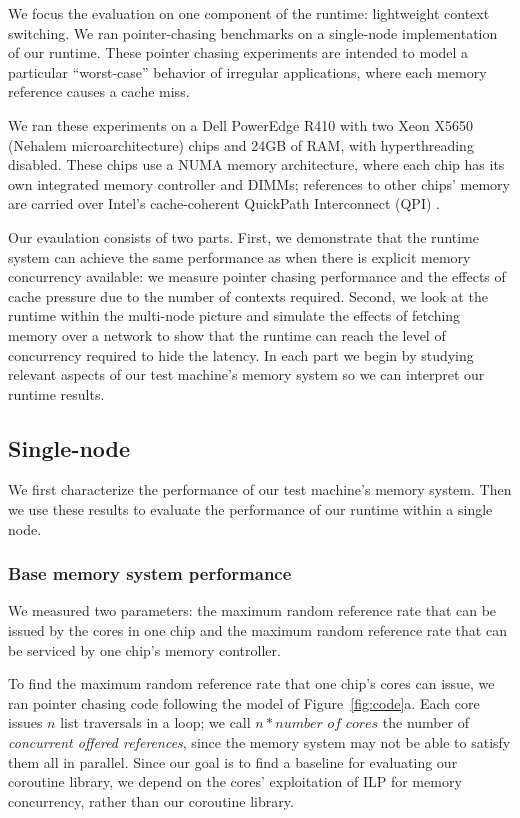 \documentclass[10pt,nocopyrightspace,preprint]{sigplanconf}
\begin{document}
We focus the evaluation on one component of the runtime: lightweight context switching. We ran pointer-chasing benchmarks on a single-node implementation of our runtime. These pointer chasing experiments are intended to model a particular ``worst-case'' behavior of irregular applications, where each memory reference causes a cache miss.

We ran these experiments on a Dell PowerEdge R410 with two Xeon X5650 (Nehalem microarchitecture)
chips and 24GB of RAM, with hyperthreading disabled. These
chips use a NUMA memory architecture, where each chip has
its own integrated memory controller and DIMMs; references to other
chips' memory are carried over Intel's cache-coherent QuickPath
Interconnect (QPI) \cite{quickpath:website}.

Our evaulation consists of two parts. First, we demonstrate that the runtime system can achieve the same performance as when there is explicit memory concurrency available: we measure pointer chasing performance and
the effects of cache pressure due to the number of contexts required. Second, we look at the runtime within the multi-node picture and simulate the effects of fetching memory over a network to show that the runtime can reach the level of concurrency required to hide the latency. In each part we begin by studying relevant aspects of our test machine's memory system so we can interpret our runtime results.


\subsection{Single-node}

We first characterize the performance of our test machine's memory
system. Then we use these results to evaluate the performance of our runtime within a single node.

\subsubsection{Base memory system performance}
\label{subsubsec:evalsinglebase}

We measured two parameters: the maximum random reference
rate that can be issued by the cores in one chip and the maximum random
reference rate that can be serviced by one chip's memory controller.

To find the maximum random reference rate that one chip's cores
can issue, we ran pointer chasing code following the model of
Figure~\ref{fig:code}a. Each core issues $n$ list traversals
in a loop; we call $n * \textit{number of cores}$ the number of
{\em concurrent offered references}, since the memory system may not
be able to satisfy them all in parallel. Since our goal is to find a
baseline for evaluating our coroutine library, we depend on the
cores' exploitation of ILP for memory concurrency, rather than our coroutine
library.
\end{document}
